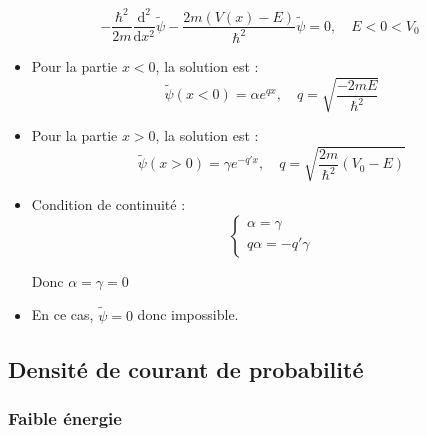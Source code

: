 \begin{equation}
 - \frac{\hbar ^{2}}{2m}  \frac{\mathrm{d} ^{2}}{\mathrm{d} x ^{2}}  \widetilde \psi - \frac{2m (V(x) - E)}{\hbar ^{2}}  \widetilde \psi = 0, \quad E < 0 < V_0
\end{equation}

\begin{itemize}

    \item  Pour la partie $x < 0$, la solution est : 
      \begin{equation}
        \widetilde \psi (x < 0) = \alpha e ^{qx}, \quad  q = \sqrt{\frac{-2mE}{\hbar ^{2}}} 
      \end{equation}

    \item Pour la partie $x > 0$, la solution est : 
      \begin{equation}
        \widetilde \psi (x>0) = \gamma e ^{-q' x}, \quad q = \sqrt{\frac{2m}{ \hbar ^{2}} (V_0 - E) }
      \end{equation}

    \item Condition de continuité : 
      \begin{equation}
        \begin{cases}
            \alpha = \gamma \\
            q \alpha  = - q' \gamma
        \end{cases}
      \end{equation}

      Donc $\alpha = \gamma = 0$

    \item En ce cas, $\widetilde \psi = 0$ donc impossible. 

\end{itemize}

\subsection{Densité de courant de probabilité} %

\subsubsection{Faible énergie} %
\label{sec:Faible énergie}

